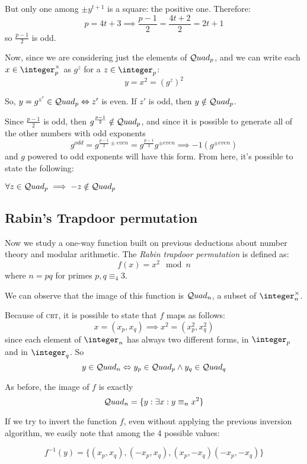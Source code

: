 But only one among $\pm y^{t + 1}$ is a square: the positive one. Therefore:
\[ 
    p = 4t + 3 \implies \frac{p - 1}{2} = \frac{4t + 2}{2} = 2t + 1
\]
so $\frac{p - 1}{2}$ is odd.

Now, since we are considering just the elements of $\mathcal{Q}uad_p$, and we can write each $x \in \integer_p^\times$ as $g^{z}$ for a $z \in \integer_p$:
\[
    y = x^2  = (g^z)^2
\]

So, $y = g^{z'} \in \mathcal{Q}uad_p \Leftrightarrow z'$ is even. If $z'$ is odd, then $y \notin \mathcal{Q}uad_p$.

Since $\frac{p - 1}{2}$ is odd, then $g^{\frac{p - 1}{2}} \notin \mathcal{Q}uad_p$, and since it is possible to generate all of the other numbers with odd exponents 
\[
    g^{odd}=g^{\frac{p-1}{2} \pm even} = g^{\frac{p-1}{2}}g^{ \pm even} \implies -1(g^{\pm even})
\]
and $g$ powered to odd exponents will have this form. From here, it's possible to state the following:

\begin{lemma}
    $\forall z \in \mathcal{Q}uad_p \implies -z \notin \mathcal{Q}uad_p$
\end{lemma}

\subsection{Rabin's Trapdoor permutation}

Now we study a one-way function built on previous deductions about number theory and modular arithmetic. The \emph{Rabin trapdoor permutation} is defined as: 
\[
    f(x) = x^2 \mod n
\]
where $n = pq$ for primes $p, q \equiv_4 3$.

We can observe that the image of this function is $\mathcal{Q}uad_n$, a subset of $\integer_n^\times$.

Because of \textsc{crt}, it is possible to state that $f$ maps as follows:
\[
    x = (x_p, x_q) \implies x^2 = (x^2_p, x^2_q)
\]
since each element of $\integer_n$ has always two different forms, in $\integer_p$ and in $\integer_q$. So
\[
    y \in  \mathcal{Q}uad_n \Leftrightarrow y_p \in \mathcal{Q}uad_p \wedge y_q \in \mathcal{Q}uad_q
\]

As before, the image of $f$ is exactly
\[
    \mathcal{Q}uad_n = \{ y : \exists x : y \equiv_n x^2\}
\]

If we try to invert the function $f$, even without applying the previous inversion algorithm, we easily note that among the 4 possible values:

\[
    f^{-1}(y) = \{(x_p, x_q),(-x_p, x_q),(x_p, -x_q)(-x_p, -x_q)\}
\]

